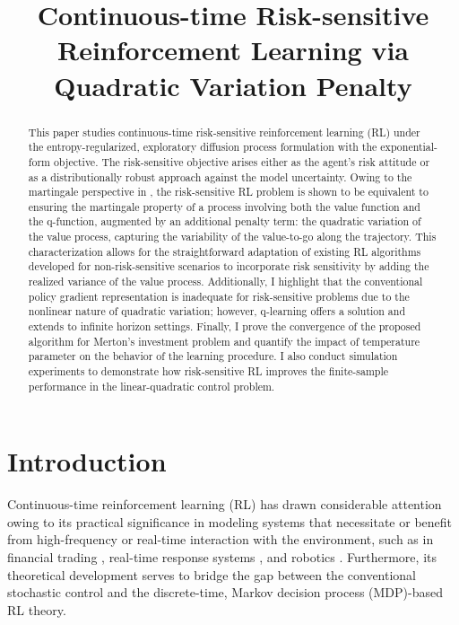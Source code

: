 
\title{Continuous-time Risk-sensitive Reinforcement Learning via Quadratic Variation Penalty}
\maketitle
\begin{abstract}
\singlespacing
This paper studies continuous-time risk-sensitive reinforcement learning (RL) under the entropy-regularized, exploratory diffusion process formulation with the exponential-form objective. The risk-sensitive objective arises either as the agent's risk attitude or as a distributionally robust approach against the model uncertainty. Owing to the martingale perspective in \citet{jia2022q}, the risk-sensitive RL problem is shown to be equivalent to ensuring the martingale property of a process involving both the value function and the q-function, augmented by an additional penalty term: the quadratic variation of the value process, capturing the variability of the value-to-go along the trajectory. This characterization allows for the straightforward adaptation of existing RL algorithms developed for non-risk-sensitive scenarios to incorporate risk sensitivity by adding the realized variance of the value process. Additionally, I highlight that the conventional policy gradient representation is inadequate for risk-sensitive problems due to the nonlinear nature of quadratic variation; however, q-learning offers a solution and extends to infinite horizon settings. Finally, I prove the convergence of the proposed algorithm for Merton's investment problem and quantify the impact of temperature parameter on the behavior of the learning procedure. I also conduct simulation experiments to demonstrate how risk-sensitive RL improves the finite-sample performance in the linear-quadratic control problem. 
\end{abstract}


\section{Introduction}
\label{sec1}
Continuous-time reinforcement learning (RL) has drawn considerable attention owing to its practical significance in modeling systems that necessitate or benefit from high-frequency or real-time interaction with the environment, such as in financial trading \citep{wang2023reinforcement}, real-time response systems \citep{andersson2015model}, and robotics \citep{kober2013reinforcement}. Furthermore, its theoretical development serves to bridge the gap between the conventional stochastic control and the discrete-time, Markov decision process (MDP)-based RL theory. 



